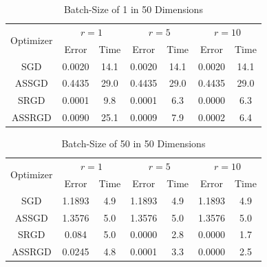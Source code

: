 \documentclass[,conference,compsoc]{IEEEtran}
\begin{document}
\begin{table}[!t]
\renewcommand{\arraystretch}{1.3}
\caption{Batch-Size of 1 in 50 Dimensions}
\label{tab:d50mb1}
\centering
\begin{tabular}{|c||c|c|c|c|c|c|}
\hline
\multirow{2}{*}{Optimizer} &
    \multicolumn{2}{c}{$r = 1$} &
    \multicolumn{2}{c}{$r = 5$} &
    \multicolumn{2}{c|}{$r = 10$}\\
    & Error & Time & Error & Time & Error & Time \\
    \hline
    SGD & 0.0020 & 14.1 & 0.0020 & 14.1 & 0.0020 & 14.1\\
    \hline
    ASSGD & 0.4435 & 29.0 & 0.4435 & 29.0 & 0.4435 & 29.0\\ 
    \hline
    SRGD & 0.0001 & 9.8 & 0.0001 & 6.3 & 0.0000 & 6.3\\
    \hline
    ASSRGD & 0.0090 & 25.1 & 0.0009 & 7.9 & 0.0002 & 6.4\\
\hline
\end{tabular}
\end{table}

\begin{table}[!t]
\renewcommand{\arraystretch}{1.3}
\caption{Batch-Size of 50 in 50 Dimensions}
\label{tab:d50mb50}
\centering
\begin{tabular}{|c||c|c|c|c|c|c|}
\hline
\multirow{2}{*}{Optimizer} &
    \multicolumn{2}{c}{$r = 1$} &
    \multicolumn{2}{c}{$r = 5$} &
    \multicolumn{2}{c|}{$r = 10$}\\
    & Error & Time & Error & Time & Error & Time \\
    \hline
    SGD & 1.1893 & 4.9 & 1.1893 & 4.9 & 1.1893 & 4.9\\ 
    \hline
    ASSGD & 1.3576 & 5.0 & 1.3576 & 5.0 & 1.3576 & 5.0\\ 
    \hline
    SRGD & 0.084 & 5.0  & 0.0000 & 2.8 & 0.0000 & 1.7\\
    \hline
    ASSRGD & 0.0245 & 4.8 & 0.0001 & 3.3 & 0.0000 & 2.5\\
\hline
\end{tabular}
\end{table}
\end{document}

